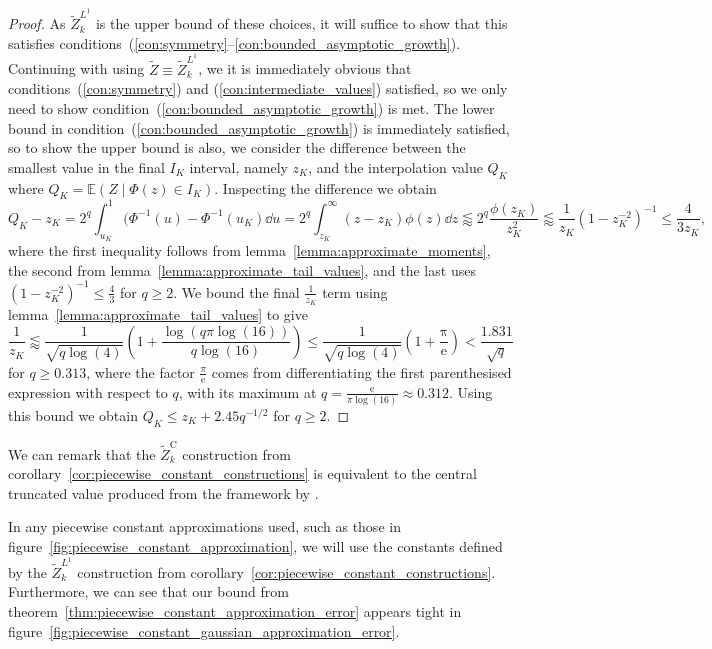 \documentclass[manuscript,review]{acmart}
\begin{document}
\begin{proof}
As $ \tilde{Z}_k^{L^1} $ is the upper bound of these choices, it will suffice to show that this satisfies conditions~(\ref{con:symmetry}--\ref{con:bounded_asymptotic_growth}).  Continuing with using $ \tilde{Z} \equiv  \tilde{Z}_k^{L^1}$, we it is immediately obvious that conditions~(\ref{con:symmetry}) and (\ref{con:intermediate_values}) satisfied, so we only need to show condition~(\ref{con:bounded_asymptotic_growth}) is met. The lower bound in condition~(\ref{con:bounded_asymptotic_growth}) is immediately satisfied, so to show the upper bound is also, we consider the difference between the smallest value in the final $ I_K $ interval, namely $ z_K $, and the interpolation value $ Q_K $ where $ Q_K = \mathbb{E}(Z \mid \Phi(z) \in I_K) $. Inspecting the difference we obtain
\begin{equation*}
Q_K - z_K = 2^q \int_{u_K}^{1} (\Phi^{-1}(u) - \Phi^{-1}(u_K) \dd{u} = 2^q \int_{z_K}^{\infty} (z - z_K) \phi(z) \dd{z} \lessapprox  2^q \dfrac{\phi(z_K)}{z_K^2} \lessapprox \dfrac{1}{z_K} (1 - z_K^{-2})^{-1} \leq \dfrac{4}{3z_K},
\end{equation*}
where the first inequality follows from lemma~\ref{lemma:approximate_moments}, the second from lemma~\ref{lemma:approximate_tail_values}, and the last uses $ (1 - z_K^{-2})^{-1} \leq \tfrac{4}{3} $ for $ q \geq 2 $. We bound the final $ \tfrac{1}{z_K} $ term using lemma~\ref{lemma:approximate_tail_values} to give
\begin{equation*}
\dfrac{1}{z_K} \lessapprox \frac{1}{\sqrt{q\log(4)}} \left(1 + \frac{\log(q\pi\log(16))}{q\log(16)}\right) \leq  \frac{1}{\sqrt{q\log(4)}}\left(1 +  \frac{\mathrm{\pi}}{\mathrm{e}}\right) <  \frac{1.831}{\sqrt{q}}
\end{equation*}
for $ q \geq 0.313 $, where the factor $ \tfrac{\pi}{\mathrm{e}} $ comes from differentiating the first parenthesised expression with respect to $ q $, with its maximum at $ q = \tfrac{\mathrm{e}}{\pi\log(16)} \approx 0.312 $. Using this bound we obtain $ Q_K \leq z_K + 2.45 q^{-1/2} $ for $ q \geq 2 $. \qedhere
\end{proof}

We can remark that the $ \tilde{Z}_k^\mathrm{C} $ construction from corollary~\ref{cor:piecewise_constant_constructions} is equivalent to the central truncated value produced from the framework by \citet[(4)]{giles2019random_quadrature}.

In any piecewise constant approximations used, such as those in figure~\ref{fig:piecewise_constant_approximation}, we will use the constants defined by  the $ \tilde{Z}_k^{L^1} $ construction from corollary~\ref{cor:piecewise_constant_constructions}. Furthermore, we can see that our bound from theorem~\ref{thm:piecewise_constant_approximation_error} appears tight in figure~\ref{fig:piecewise_constant_gaussian_approximation_error}.
\end{document}
